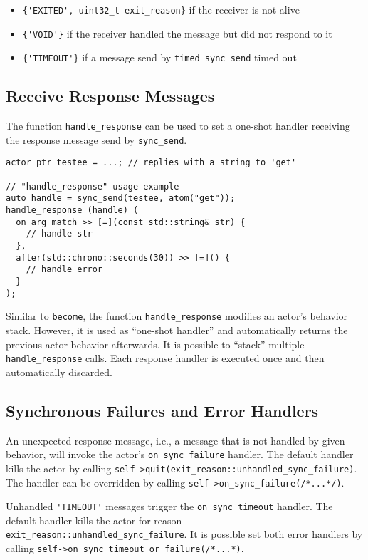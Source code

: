 \begin{itemize}
\item \lstinline^{'EXITED', uint32_t exit_reason}^ if the receiver is not alive
\item \lstinline^{'VOID'}^ if the receiver handled the message but did not respond to it
\item \lstinline^{'TIMEOUT'}^ if a message send by \lstinline^timed_sync_send^ timed out
\end{itemize}

\clearpage
\subsection{Receive Response Messages}

The function \lstinline^handle_response^ can be used to set a one-shot handler receiving the response message send by \lstinline^sync_send^.

\begin{lstlisting}
actor_ptr testee = ...; // replies with a string to 'get'

// "handle_response" usage example
auto handle = sync_send(testee, atom("get"));
handle_response (handle) (
  on_arg_match >> [=](const std::string& str) {
    // handle str
  },
  after(std::chrono::seconds(30)) >> [=]() {
    // handle error
  }
);
\end{lstlisting}

Similar to \lstinline^become^, the function \lstinline^handle_response^ modifies an actor's behavior stack.
However, it is used as ``one-shot handler'' and automatically returns the previous actor behavior afterwards.
It is possible to ``stack'' multiple \lstinline^handle_response^ calls.
Each response handler is executed once and then automatically discarded.

\subsection{Synchronous Failures and Error Handlers}

An unexpected response message, i.e., a message that is not handled by given behavior, will invoke the actor's \lstinline^on_sync_failure^ handler.
The default handler kills the actor by calling \lstinline^self->quit(exit_reason::unhandled_sync_failure)^.
The handler can be overridden by calling \lstinline^self->on_sync_failure(/*...*/)^.

Unhandled \lstinline^'TIMEOUT'^ messages trigger the \lstinline^on_sync_timeout^ handler.
The default handler kills the actor for reason \lstinline^exit_reason::unhandled_sync_failure^.
It is possible set both error handlers by calling \lstinline^self->on_sync_timeout_or_failure(/*...*)^.


